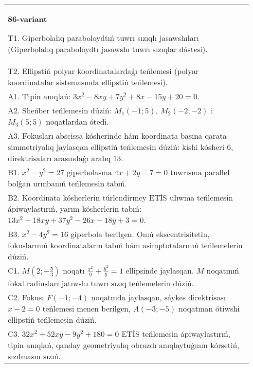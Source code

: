\documentclass{article}
\begin{document}
\begin{tabular}{m{17cm}}
\textbf{86-variant}
\newline

T1. Giperbolalıq paraboloydtıń tuwrı sızıqlı jasawshıları (Giperbolalıq paraboloydtı jasawshı tuwrı sızıqlar dástesi).\\

T2. Ellipstiń polyar koordinatalardaǵı teńlemesi (polyar koordinatalar sistemasında ellipstiń teńlemesi).\\

A1. Tipin anıqlań: $3 x^{2}-8 xy+7 y^{2}+8 x-15 y+20=0$.\\

A2. Sheńber teńlemesin dúziń: $M_1 (-1;5) $, $M_2 (-2;-2) $ i $M_3 (5;5) $ noqatlardan ótedi.\\

A3. Fokusları abscissa kósherinde hám koordinata basına qarata simmetriyalıq jaylasqan ellipstiń teńlemesin dúziń: kishi kósheri $6$, direktrisaları arasındaǵı aralıq $13$.\\

B1. $x^{2} - y^{2} = 27$ giperbolasına $4x + 2y - 7 = 0$ tuwrısına parallel bolǵan urınbanıń teńlemesin tabıń.  \\

B2. Koordinata kósherlerin túrlendirmey ETİS ulıwma teńlemesin ápiwaylastırıń, yarım kósherlerin tabıń: $13x^{2} + 18xy + 37y^{2} - 26x - 18y + 3 = 0$.  \\

B3. $x^{2} - 4y^{2} = 16$ giperbola berilgen. Onıń ekscentrisitetin, fokuslarınıń koordinataların tabıń hám asimptotalarınıń teńlemelerin dúziń.\\

C1. $M(2; - \frac{5}{3})$ noqatı $\frac{x^{2}}{9} + \frac{y^{2}}{5} = 1$ ellipsinde jaylasqan. $M$ noqatınıń fokal radiusları jatıwshı tuwrı sızıq teńlemelerin dúziń.  \\

C2. Fokusı $F( - 1; - 4)$ noqatında jaylasqan, sáykes direktrisası $x - 2 = 0$ teńlemesi menen berilgen, $A( - 3; - 5)$ noqatınan ótiwshi ellipstiń teńlemesin dúziń.  \\

C3. $32x^{2} + 52xy - 9y^{2} + 180 = 0$ ETİS teńlemesin ápiwaylastırıń, tipin anıqlań, qanday geometriyalıq obrazdı anıqlaytuǵının kórsetiń, sızılmasın sızıń.  \\

\end{tabular}
\vspace{1cm}
\end{document}
